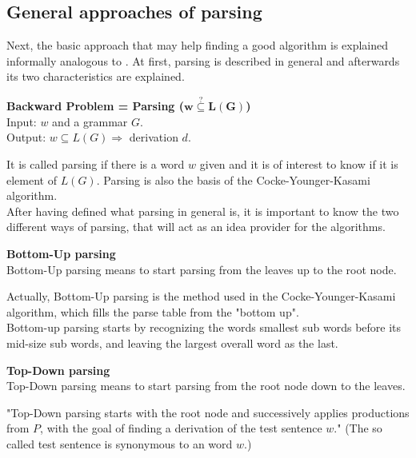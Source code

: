 \subsection{General approaches of parsing} \label{approaches}
Next, the basic approach that may help finding a good algorithm is explained informally analogous to \cite{Duda.2012}. At first, parsing is described in general and afterwards its two characteristics are explained.  
\begin{DefGrey}
	\textbf{Backward Problem = Parsing ($\mathbf{w\overset{?}{\subseteq}L(G)}$)}\\
	Input: $w$ and a grammar $G$. \\
	Output: $w \subseteq L(G) \Longrightarrow$ derivation $d$.
\end{DefGrey}
\noindent It is called parsing if there is a word $w$ given and it is of interest to know if it is element of $L(G)$. Parsing is also the basis of the Cocke-Younger-Kasami algorithm.\\
After having defined what parsing in general is, it is important to know the two different ways of parsing, that will act as an idea provider for the algorithms.
\begin{mdframed}[backgroundcolor=defColour]
	\textbf{Bottom-Up parsing} \\
Bottom-Up parsing means to start parsing from the leaves up to the root node.
\end{mdframed}
\noindent Actually, Bottom-Up parsing is the method used in the Cocke-Younger-Kasami algorithm, which fills the parse table from the "bottom up"\cite{Duda.2012}.\\
Bottom-up parsing starts by recognizing the words smallest sub words before its mid-size sub words, and leaving the largest overall word as the last.
\begin{mdframed}[backgroundcolor=defColour]
	\textbf{Top-Down parsing} \\
	 Top-Down parsing means to start parsing from the root node down to the leaves.
\end{mdframed}
\noindent "Top-Down parsing starts with the root node and successively applies productions from $P$, with the goal of finding a derivation of the test sentence $w$." \cite{Duda.2012} (The so called test sentence is synonymous to an word $w$.)

